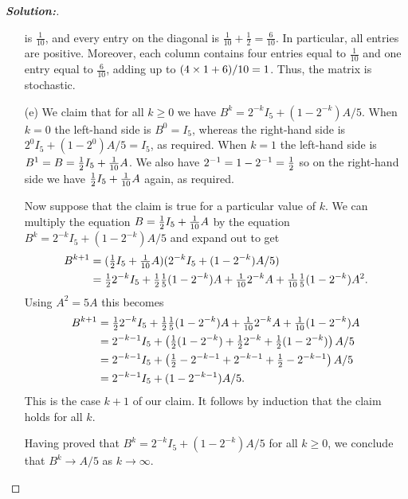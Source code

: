 \documentclass[a4paper]{amsart}
\theoremstyle{definition}
\newenvironment{solution}{\begin{proof}[\textbf{Solution:}] \vphantom{u}}{\end{proof}}
\begin{document}
\begin{solution}
\begin{itemize}
   is $\frac{1}{10}$, and every entry on the diagonal is
   $\frac{1}{10}+\frac{1}{2}=\frac{6}{10}$.  In particular, all
   entries are positive.  Moreover, each column contains four entries
   equal to $\frac{1}{10}$ and one entry equal to $\frac{6}{10}$,
   adding up to $(4\tm 1 + 6)/10=1$.  Thus, the matrix is stochastic.
  \item[(e)] We claim that for all $k\geq 0$ we have
   $B^k=2^{-k}I_5+(1-2^{-k})A/5$.  When $k=0$ the left-hand side is
   $B^0=I_5$, whereas the right-hand side is $2^0I_5+(1-2^0)A/5=I_5$, as
   required.  When $k=1$ the left-hand side is
   $B^1=B=\tfrac{1}{2} I_5+\tfrac{1}{10}A$.  We also have
   $2^{-1}=1-2^{-1}=\tfrac{1}{2}$ so on the right-hand side we have
   $\tfrac{1}{2} I_5+\frac{1}{10}A$ again, as required.

   Now suppose that the claim is true for a particular value of $k$.
   We can multiply the equation $B=\tfrac{1}{2} I_5+\tfrac{1}{10}A$ by the
   equation $B^k=2^{-k}I_5+(1-2^{-k})A/5$ and expand out to get
   \begin{align*}
    B^{k+1} &= (\tfrac{1}{2} I_5+\tfrac{1}{10}A)(2^{-k}I_5+(1-2^{-k})A/5) \\
     &= \tfrac{1}{2} 2^{-k}I_5 + \tfrac{1}{2}\tfrac{1}{5}(1-2^{-k})A 
         + \tfrac{1}{10} 2^{-k}A
         + \tfrac{1}{10}\tfrac{1}{5}(1-2^{-k})A^2.
   \end{align*}
   Using $A^2=5A$ this becomes
   \begin{align*}
    B^{k+1} 
     &= \tfrac{1}{2} 2^{-k}I_5 + \tfrac{1}{2}\tfrac{1}{5}(1-2^{-k})A 
         + \tfrac{1}{10} 2^{-k}A
         + \tfrac{1}{10}(1-2^{-k})A \\
     &= 2^{-k-1}I_5 +
         \left(\tfrac{1}{2}(1-2^{-k})+\tfrac{1}{2} 2^{-k}+\tfrac{1}{2}(1-2^{-k})\right)A/5 \\
     &= 2^{-k-1}I_5 +
         \left(\tfrac{1}{2}-2^{-k-1}+2^{-k-1}+\tfrac{1}{2}-2^{-k-1}\right)A/5 \\
     &= 2^{-k-1}I_5 + (1-2^{-k-1})A/5.
   \end{align*}
   This is the case $k+1$ of our claim.  It follows by induction that
   the claim holds for all $k$.
   
   Having proved that $B^k=2^{-k}I_5+(1-2^{-k})A/5$ for all $k\geq 0$,
   we conclude that $B^k \to A/5$ as $k\to\infty$.
 \end{itemize}
\end{solution}
\end{document}
